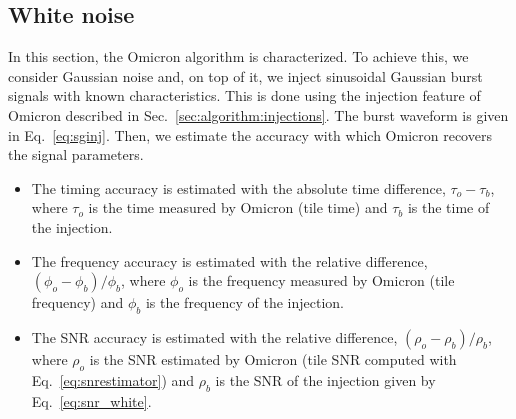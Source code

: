 \subsection{White noise} \label{sec:characterization:white}
In this section, the Omicron algorithm is characterized. To achieve this, we consider Gaussian noise and, on top of it, we inject sinusoidal Gaussian burst signals with known characteristics. This is done using the injection feature of Omicron described in Sec.~\ref{sec:algorithm:injections}. The burst waveform is given in Eq.~\ref{eq:sginj}. Then, we estimate the accuracy with which Omicron recovers the signal parameters.
\begin{itemize}
\item The timing accuracy is estimated with the absolute time difference, $\tau_o-\tau_b$, where $\tau_o$ is the time measured by Omicron (tile time) and $\tau_b$ is the time of the injection.
\item The frequency accuracy is estimated with the relative difference, $(\phi_o-\phi_b)/\phi_b$, where $\phi_o$ is the frequency measured by Omicron (tile frequency) and $\phi_b$ is the frequency of the injection.
\item The SNR accuracy is estimated with the relative difference, $(\rho_o-\rho_b)/\rho_b$, where $\rho_o$ is the SNR estimated by Omicron (tile SNR computed with Eq.~\ref{eq:snrestimator}) and $\rho_b$ is the SNR of the injection given by Eq.~\ref{eq:snr_white}.
\end{itemize}

